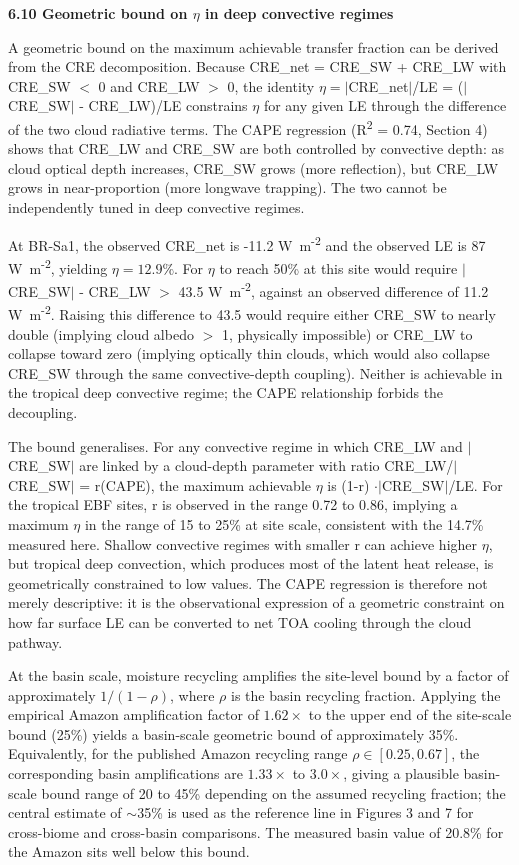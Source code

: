 \textbf{6.10 Geometric bound on \(\eta\) in deep convective regimes}

A geometric bound on the maximum achievable transfer fraction can be derived from the CRE decomposition. Because CRE\_net = CRE\_SW + CRE\_LW with CRE\_SW \(<\) 0 and CRE\_LW \(>\) 0, the identity \(\eta = |\)CRE\_net\(|\)/LE = (\(|\)CRE\_SW\(|\) - CRE\_LW)/LE constrains \(\eta\) for any given LE through the difference of the two cloud radiative terms. The CAPE regression (R\textsuperscript{2} = 0.74, Section 4) shows that CRE\_LW and CRE\_SW are both controlled by convective depth: as cloud optical depth increases, CRE\_SW grows (more reflection), but CRE\_LW grows in near-proportion (more longwave trapping). The two cannot be independently tuned in deep convective regimes.

At BR-Sa1, the observed CRE\_net is -11.2 W~m\textsuperscript{-2} and the observed LE is 87 W~m\textsuperscript{-2}, yielding \(\eta = 12.9\%\). For \(\eta\) to reach 50\% at this site would require \(|\)CRE\_SW\(|\) - CRE\_LW \(>\) 43.5 W~m\textsuperscript{-2}, against an observed difference of 11.2 W~m\textsuperscript{-2}. Raising this difference to 43.5 would require either CRE\_SW to nearly double (implying cloud albedo \(>\) 1, physically impossible) or CRE\_LW to collapse toward zero (implying optically thin clouds, which would also collapse CRE\_SW through the same convective-depth coupling). Neither is achievable in the tropical deep convective regime; the CAPE relationship forbids the decoupling.

The bound generalises. For any convective regime in which CRE\_LW and \(|\)CRE\_SW\(|\) are linked by a cloud-depth parameter with ratio CRE\_LW/\(|\)CRE\_SW\(|\) = r(CAPE), the maximum achievable \(\eta\) is (1-r) \(\cdot |\)CRE\_SW\(|\)/LE. For the tropical EBF sites, r is observed in the range 0.72 to 0.86, implying a maximum \(\eta\) in the range of 15 to 25\% at site scale, consistent with the 14.7\% measured here. Shallow convective regimes with smaller r can achieve higher \(\eta\), but tropical deep convection, which produces most of the latent heat release, is geometrically constrained to low values. The CAPE regression is therefore not merely descriptive: it is the observational expression of a geometric constraint on how far surface LE can be converted to net TOA cooling through the cloud pathway.

At the basin scale, moisture recycling amplifies the site-level bound by a factor of approximately \(1 / (1 - \rho)\), where \(\rho\) is the basin recycling fraction. Applying the empirical Amazon amplification factor of \(1.62\times\) to the upper end of the site-scale bound (25\%) yields a basin-scale geometric bound of approximately 35\%. Equivalently, for the published Amazon recycling range \(\rho \in [0.25, 0.67]\), the corresponding basin amplifications are \(1.33\times\) to \(3.0\times\), giving a plausible basin-scale bound range of 20 to 45\% depending on the assumed recycling fraction; the central estimate of \(\sim\)35\% is used as the reference line in Figures 3 and 7 for cross-biome and cross-basin comparisons. The measured basin value of 20.8\% for the Amazon sits well below this bound.

